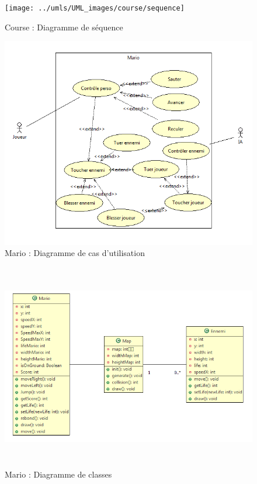 \begin{figure}[h]
 \centering
 \texttt{[image: ../umls/UML\_images/course/sequence]} \hfill
 \caption{Course : Diagramme de séquence}
\end{figure}

\clearpage

\begin{figure}[h]
 \centering
 \includegraphics[width=\textwidth]{../umls/UML_images/Mario/Utilisation} \hfill
 \caption{Mario : Diagramme de cas d'utilisation}
\end{figure}

\begin{figure}[h]
 \centering
 \includegraphics[height=9cm]{../umls/UML_images/Mario/Class} \hfill
 \caption{Mario : Diagramme de classes}
\end{figure}

